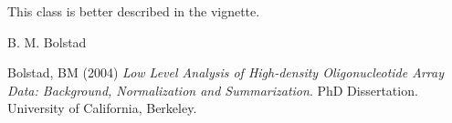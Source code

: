 \begin{Note}\relax
This class is better described in the vignette.
\end{Note}
\begin{Author}\relax
B. M. Bolstad 
\end{Author}
\begin{References}\relax
Bolstad, BM (2004) \emph{Low Level Analysis of High-density
Oligonucleotide Array Data: Background, Normalization and
Summarization}. PhD Dissertation. University of California,
Berkeley.
\end{References}

